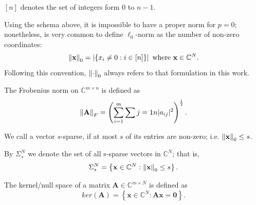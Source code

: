 \begin{tight_equations}
\begin{notation}
$[n]$ denotes the set of integers form $0$ to $n-1$.
\end{notation}

\begin{remark}
Using the schema above, it is impossible to have a proper norm for $p = 0$; nonetheless, is very common to define $\ell_0$-norm as the number of non-zero coordinates:
\[\left\lVert\mathbf{x}\right\rVert_0 = \left| \left\{x_i \ne 0 : i \in [n]\right\}\right| \text{ where } \mathbf{x} \in \mathbb{C}^N.\]
Following this convention, $\left\lVert\cdot\right\rVert_0$ always refers to that formulation in this work.
\end{remark}

\begin{definition}
The Frobenius norm on $\mathbb{C}^{m \times n}$ is defined as
\[\left\lVert\mathbf{A}\right\rVert_F = \left(\sum_{i=1}^m\sum{j=1}{n}|a_{ij}|^2\right)^\frac{1}{2}.\]
\end{definition}

\begin{definition}[sparsity]
We call a vector $s$-sparse, if at most $s$ of its entries are non-zero; i.e. $\left\lVert\mathbf{x}\right\rVert_0 \le s$.
\end{definition}

\begin{notation}
By $\Sigma_s^N$ we denote the set of all s-sparse vectors in $\mathbb{C}^N$; that is,
\[\Sigma_s^N = \left\{\mathbf{x} \in \mathbb{C}^N : \left\lVert\mathbf{x}\right\rVert_0 \le s \right\}.\]
\end{notation}



\begin{definition}
The kernel/null space of a matrix $\mathbf{A} \in \mathbb{C}^{m \times N}$ is defined as
\[ker(\mathbf{A}) = \left\{\mathbf{x} \in \mathbb{C}^N : \mathbf{Ax} = \mathbf{0}\right\}.\]
\end{definition}


\end{tight_equations}
